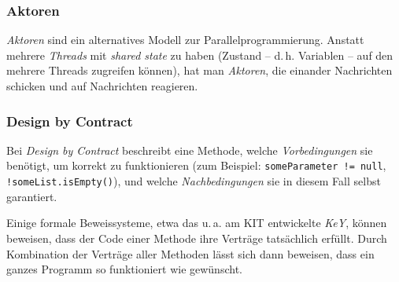 \documentclass{beamer}
\begin{document}
\begin{frame}
  \frametitle{Aktoren}
  \emph{Aktoren} sind ein alternatives Modell zur Parallelprogrammierung.
  Anstatt mehrere \emph{Threads} mit \emph{shared state} zu haben
  (Zustand – d.\,h. Variablen – auf den mehrere Threads zugreifen können),
  hat man \emph{Aktoren}, die einander Nachrichten schicken und auf Nachrichten reagieren.
\end{frame}

\begin{frame}
  \frametitle{Design by Contract}
  Bei \emph{Design by Contract} beschreibt eine Methode,
  welche \emph{Vorbedingungen} sie benötigt, um korrekt zu funktionieren
  (zum Beispiel: \lstinline{someParameter != null}, \lstinline{!someList.isEmpty()}),
  und welche \emph{Nachbedingungen} sie in diesem Fall selbst garantiert.
  
  Einige formale Beweissysteme,
  etwa das u.\,a. am KIT entwickelte \emph{KeY},
  können beweisen, dass der Code einer Methode ihre Verträge tatsächlich erfüllt.
  Durch Kombination der Verträge aller Methoden lässt sich dann beweisen,
  dass ein ganzes Programm so funktioniert wie gewünscht.
\end{frame}
\end{document}
